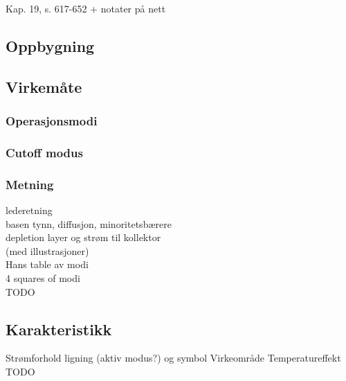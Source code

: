 Kap. 19, s. 617-652
+ notater på nett

\subsection{Oppbygning}


\subsection{Virkemåte}
  \subsubsection{Operasjonsmodi}
    
  \subsubsection{Cutoff modus}
    
  \subsubsection{Metning}
    
lederetning \\
basen tynn, diffusjon, minoritetsbærere \\
depletion layer og strøm til kollektor \\
(med illustrasjoner) \\
Hans table av modi \\
4 squares of modi \\
TODO

\subsection{Karakteristikk}
Strømforhold ligning (aktiv modus?) og symbol
Virkeområde
Temperatureffekt
TODO
